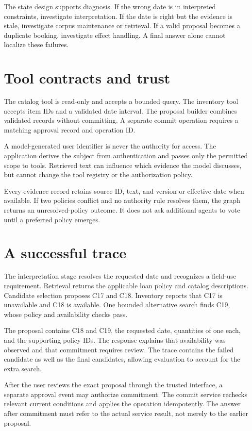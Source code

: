 The state design supports diagnosis. If the wrong date is in interpreted constraints, investigate interpretation. If the date is right but the evidence is stale, investigate corpus maintenance or retrieval. If a valid proposal becomes a duplicate booking, investigate effect handling. A final answer alone cannot localize these failures.

\section{Tool contracts and trust}
The catalog tool is read-only and accepts a bounded query. The inventory tool accepts item IDs and a validated date interval. The proposal builder combines validated records without committing. A separate commit operation requires a matching approval record and operation ID.

A model-generated user identifier is never the authority for access. The application derives the subject from authentication and passes only the permitted scope to tools. Retrieved text can influence which evidence the model discusses, but cannot change the tool registry or the authorization policy.

Every evidence record retains source ID, text, and version or effective date when available. If two policies conflict and no authority rule resolves them, the graph returns an unresolved-policy outcome. It does not ask additional agents to vote until a preferred policy emerges.

\section{A successful trace}
The interpretation stage resolves the requested date and recognizes a field-use requirement. Retrieval returns the applicable loan policy and catalog descriptions. Candidate selection proposes C17 and C18. Inventory reports that C17 is unavailable and C18 is available. One bounded alternative search finds C19, whose policy and availability checks pass.

The proposal contains C18 and C19, the requested date, quantities of one each, and the supporting policy IDs. The response explains that availability was observed and that commitment requires review. The trace contains the failed candidate as well as the final candidates, allowing evaluation to account for the extra search.

After the user reviews the exact proposal through the trusted interface, a separate approval event may authorize commitment. The commit service rechecks relevant current conditions and applies the operation idempotently. The answer after commitment must refer to the actual service result, not merely to the earlier proposal.

